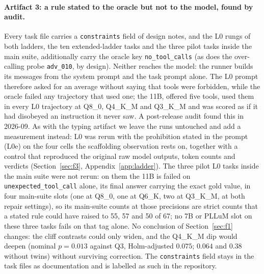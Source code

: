\documentclass[11pt]{article}
\begin{document}
\paragraph{Artifact 3: a rule stated to the oracle but not to the model, found by audit.} Every task file carries a \texttt{constraints} field of design notes, and the L0 rungs of both ladders, the ten extended-ladder tasks and the three pilot tasks inside the main suite, additionally carry the oracle key \texttt{no\_tool\_calls} (as does the over-calling probe \texttt{adv\_010}, by design). Neither reaches the model: the runner builds its messages from the system prompt and the task prompt alone. The L0 prompt therefore asked for an average without saying that tools were forbidden, while the oracle failed any trajectory that used one; the 11B, offered five tools, used them in every L0 trajectory at Q8\_0, Q4\_K\_M and Q3\_K\_M and was scored as if it had disobeyed an instruction it never saw. A post-release audit found this in 2026-09. As with the typing artifact we leave the runs untouched and add a measurement instead: L0 was rerun with the prohibition stated in the prompt (L0e) on the four cells the scaffolding observation rests on, together with a control that reproduced the original raw model outputs, token counts and verdicts (Section~\ref{sec:f3}, Appendix~\ref{app:ladder}). The three pilot L0 tasks inside the main suite were not rerun: on them the 11B is failed on \texttt{unexpected\_tool\_call} alone, its final answer carrying the exact gold value, in four main-suite slots (one at Q8\_0, one at Q6\_K, two at Q3\_K\_M, at both repair settings), so its main-suite counts at those precisions are strict counts that a stated rule could have raised to 55, 57 and 50 of 67; no 7B or PLLuM slot on these three tasks fails on that tag alone. No conclusion of Section~\ref{sec:f1} changes: the cliff contrasts could only widen, and the Q4\_K\_M dip would deepen (nominal $p=0.013$ against Q3, Holm-adjusted $0.075$; $0.064$ and $0.38$ without twins) without surviving correction. The \texttt{constraints} field stays in the task files as documentation and is labelled as such in the repository.
\end{document}
